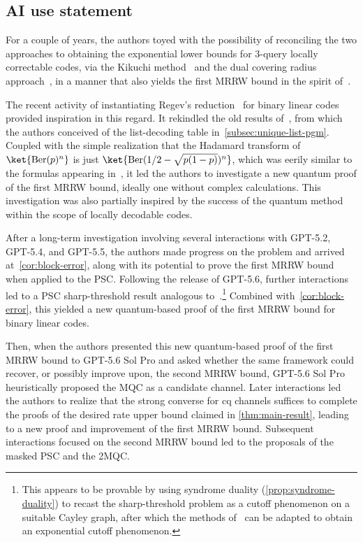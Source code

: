 \documentclass[11pt]{article}
\theoremstyle{remark}
\newcommand{\Ber}{\operatorname{Ber}}
\begin{document}
\subsection{AI use statement}

For a couple of years, the authors toyed with the possibility of reconciling the two approaches to obtaining the exponential lower bounds for 3-query locally correctable codes, via the Kikuchi method~\cite{KM24,Yan24,KM24b} and the dual covering radius approach~\cite{IS20,AG24}, in a manner that also yields the first MRRW bound in the spirit of~\cite{NS09}. 

The recent activity of instantiating Regev's reduction~\cite{Reg09} for binary linear codes~\cite{CLZ22,DART24,CT24,JSWZSKIKB25,MFGH25,CT25,PR25,BCT26,KOW26} provided inspiration in this regard. It rekindled the old results of~\cite{Tie90}, from which the authors conceived of the list-decoding table in~\cref{subsec:unique-list-pgm}. Coupled with the simple realization that the Hadamard transform of $\ket{\Ber(p)^n}$ is just $\ket{\Ber(1/2 - \sqrt{p(1-p)})^n}$, which was eerily similar to the formulas appearing in~\cite{Tie90,MRRW77}, it led the authors to investigate a new quantum proof of the first MRRW bound, ideally one without complex calculations. This investigation was also partially inspired by the success of the quantum method~\cite{KdW04} within the scope of locally decodable codes.

After a long-term investigation involving several interactions with GPT-5.2, GPT-5.4, and GPT-5.5, the authors made progress on the problem and arrived at~\cref{cor:block-error}, along with its potential to prove the first MRRW bound when applied to the PSC. Following the release of GPT-5.6, further interactions led to a PSC sharp-threshold result analogous to~\cite{TZ00,PSW24}.\footnote{This appears to be provable by using syndrome duality (\cref{prop:syndrome-duality}) to recast the sharp-threshold problem as a cutoff phenomenon on a suitable Cayley graph, after which the methods of~\cite{Sal24} can be adapted to obtain an exponential cutoff phenomenon.} Combined with~\cref{cor:block-error}, this yielded a new quantum-based proof of the first MRRW bound for binary linear codes.

Then, when the authors presented this new quantum-based proof of the first MRRW bound to GPT-5.6 Sol Pro and asked whether the same framework could recover, or possibly improve upon, the second MRRW bound, GPT-5.6 Sol Pro heuristically proposed the MQC as a candidate channel. Later interactions led the authors to realize that the strong converse for cq channels suffices to complete the proofs of the desired rate upper bound claimed in \cref{thm:main-result}, leading to a new proof and improvement of the first MRRW bound. Subsequent interactions focused on the second MRRW bound led to the proposals of the masked PSC and the 2MQC.
\end{document}
